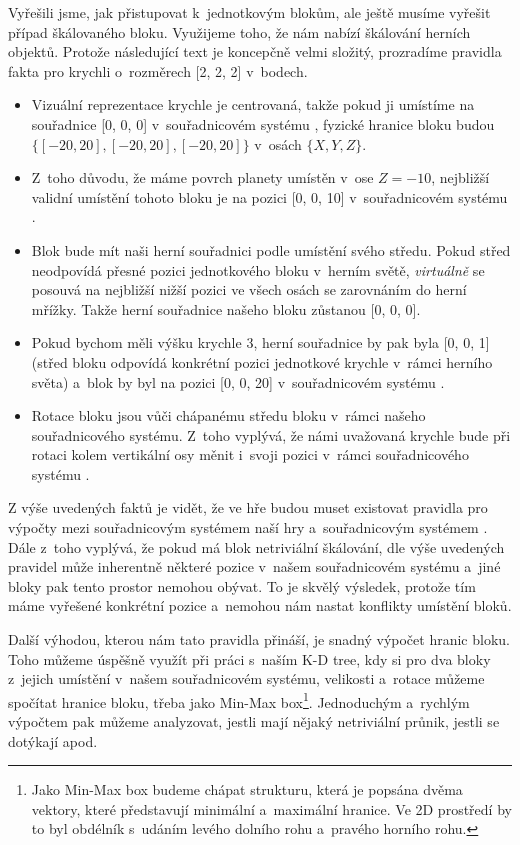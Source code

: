 Vyřešili jsme, jak přistupovat k~jednotkovým blokům, ale ještě musíme vyřešit případ škálovaného bloku. Využijeme toho, že \UE{} nám nabízí škálování herních objektů. Protože následující text je koncepčně velmi složitý, prozradíme pravidla fakta pro krychli o~rozměrech [2, 2, 2] v~bodech.

\begin{itemize}
	\item Vizuální reprezentace krychle je centrovaná, takže pokud ji umístíme na souřadnice [0, 0, 0] v~souřadnicovém systému \UEu{}, fyzické hranice bloku budou $\{ [-20, 20], [-20, 20], [-20, 20]\}$ v~osách $\{X, Y, Z\}$.
	\item Z~toho důvodu, že máme povrch planety umístěn v~ose $Z = -10$, nejbližší validní umístění tohoto bloku je na pozici [0, 0, 10] v~souřadnicovém systému \UEu{}.
	\item Blok bude mít naši herní souřadnici podle umístění svého středu. Pokud střed neodpovídá přesné pozici jednotkového bloku v~herním světě, \textit{virtuálně} se posouvá na nejbližší nižší pozici ve všech osách se zarovnáním do herní mřížky. Takže herní souřadnice našeho bloku zůstanou [0, 0, 0]. 
	\item Pokud bychom měli výšku krychle 3, herní souřadnice by pak byla [0, 0, 1] (střed bloku odpovídá konkrétní pozici jednotkové krychle v~rámci herního světa) a~blok by byl na pozici [0, 0, 20] v~souřadnicovém systému \UEu{}.
	\item Rotace bloku jsou vůči chápanému středu bloku v~rámci našeho souřadnicového systému. Z~toho vyplývá, že námi uvažovaná krychle bude při rotaci kolem vertikální osy měnit i~svoji pozici v~rámci souřadnicového systému \UEu{}.
\end{itemize}

Z výše uvedených faktů je vidět, že ve hře budou muset existovat pravidla pro výpočty mezi souřadnicovým systémem naší hry a~souřadnicovým systémem \UEu{}. Dále z~toho vyplývá, že pokud má blok netriviální škálování, dle výše uvedených pravidel může inherentně  některé pozice v~našem souřadnicovém systému a~jiné bloky pak tento prostor nemohou obývat. To je skvělý výsledek, protože tím máme vyřešené konkrétní pozice a~nemohou nám nastat konflikty umístění bloků.

Další výhodou, kterou nám tato pravidla přináší, je snadný výpočet hranic bloku. Toho můžeme úspěšně využít při práci s~naším K-D tree, kdy si pro dva bloky z~jejich umístění v~našem souřadnicovém systému, velikosti a~rotace můžeme spočítat hranice bloku, třeba jako Min-Max box\footnote{Jako Min-Max box budeme chápat strukturu, která je popsána dvěma vektory, které představují minimální a~maximální hranice. Ve 2D prostředí by to byl obdélník s~udáním levého dolního rohu a~pravého horního rohu.}. Jednoduchým a~rychlým výpočtem pak můžeme analyzovat, jestli mají nějaký netriviální průnik, jestli se dotýkají apod.

